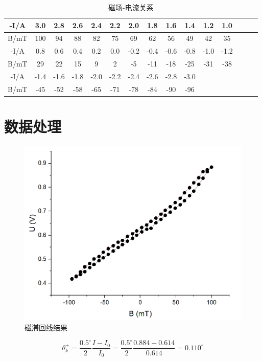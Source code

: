 \documentclass{article}
\begin{document}
\begin{table}[!h]
	\centering
	\caption{\heiti{}磁场-电流关系}
	\begin{tabular}{|c|c|c|c|c|c|c|c|c|c|c|c|c|c|c|}
		
		\hline
		-I/A&3.0&2.8&2.6&2.4&2.2&2.0&1.8&1.6&1.4&1.2&1.0\\
		\hline
		B/mT&100&94&88&82&75&69&62&56&49&42&35\\
		\hline
		-I/A&0.8&0.6&0.4&0.2&0.0&-0.2&-0.4&-0.6&-0.8&-1.0&-1.2\\
		\hline
		B/mT&29&22&15&9&2&-5&-11&-18&-25&-31&-38\\
		\hline
		-I/A&-1.4&-1.6&-1.8&-2.0&-2.2&-2.4&-2.6&-2.8&-3.0&&\\
		\hline
		B/mT&-45&-52&-58&-65&-71&-78&-84&-90&-96&&\\
		\hline
	\end{tabular}
\end{table}
	\section{数据处理}
	\begin{figure}[!h]
		
		\centering
		\includegraphics[scale=0.7]{磁滞回线}
		\caption{\heiti{}磁滞回线结果}
		
	\end{figure}


\begin{equation}
	\theta_k^+=\frac{0.5^{\circ}}{2}\frac{I-I_0}{I_0}=\frac{0.5^{\circ}}{2}\frac{0.884-0.614}{0.614}=0.110^{\circ}
\end{equation}
\end{document}
